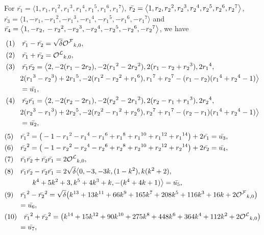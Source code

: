 \begin{lemma}\label{2.4l}
For $\bar{r_1}=\big\langle 1, r_1, {r_1}^2, {r_1}^3, {r_1}^4, {r_1}^5, {r_1}^6, {r_1}^7\big\rangle$, $\bar{r_2}=\big\langle 1, r_2, {r_2}^2, {r_2}^3, {r_2}^4,\\ {r_2}^5, {r_2}^6, {r_2}^7\big\rangle$, $\bar{r_3}=\big\langle 1, -r_1, -{r_1}^2, -{r_1}^3, -{r_1}^4, -{r_1}^5, -{r_1}^6, -{r_1}^7\big\rangle$ and $\bar{r_4}=\big\langle 1, -r_2,\\ -{r_2}^2, -{r_2}^3, -{r_2}^4, -{r_2}^5, -{r_2}^6, -{r_2}^7\big\rangle$, we have
\begin{align*}
&(1)\quad\bar{r_1}-\bar{r_2}=\sqrt{\delta}{{\mathcal{O^F}}}_{k,0},\\ 
&(2)\quad\bar{r_1}+\bar{r_2}={{\mathcal{O^L}}}_{k,0},\\
&(3)\quad\bar{r_1}\bar{r_2}=\big\langle 2, -2(r_1-2r_2), -2({r_1}^2-2{r_2}^2), 2(r_1-r_2+{r_2}^3), 2{r_1}^4, \\&\qquad 2({r_1}^3-{r_2}^3)+2{r_1}^5, -2({r_1}^2-{r_2}^2+{r_1}^6), {r_1}^7+{r_2}^7-(r_1-r_2)({r_1}^4+{r_2}^4-1)\big\rangle\\&\qquad=\bar{u_1},\\
&(4)\quad\bar{r_2}\bar{r_1}=\big{\langle} 2, -2(r_2-2r_1), -2({r_2}^2-2{r_1}^2), 2(r_2-r_1+{r_1}^3), 2{r_2}^4, \\&\qquad 2({r_2}^3-{r_1}^3)+2{r_2}^5, -2({r_2}^2-{r_1}^2+{r_2}^6), {r_2}^7+{r_1}^7-(r_2-r_1)({r_1}^4+{r_2}^4-1)\big{\rangle}\\&\qquad=\bar{u_2},\\
\end{align*}
\begin{align*}
&(5)\quad{\bar{r_1}}^2=\big(-1-{r_1}^2-{r_1}^4-{r_1}^6+{r_1}^8+{r_1}^{10}+{r_1}^{12}+{r_1}^{14}\big)+2\bar{r_1}=\bar{u_3},\\
&(6)\quad{\bar{r_2}}^2=\big(-1-{r_2}^2-{r_2}^4-{r_2}^6+{r_2}^8+{r_2}^{10}+{r_2}^{12}+{r_2}^{14}\big)+2\bar{r_2}=\bar{u_4},\\
&(7)\quad\bar{r_1}\bar{r_2}+\bar{r_2}\bar{r_1}=2\hq_{k,0},\\
&(8)\quad\bar{r_1}\bar{r_2}-\bar{r_2}\bar{r_1}=2\sqrt{\delta}\big\langle0, -3, -3k, (1-k^2), k(k^2+2),\\&\qquad \qquad  k^4+5k^2+3, k^5+4k^3+k, -(k^4+4k+1)\big\rangle=\bar{u_5},\\
&(9)\quad{\bar{r_1}}^2-{\bar{r_2}}^2=\sqrt{\delta}\big( k^{13}+13k^{11}+66k^9+165k^7+208k^5+116k^3+16k+2\hp_{k,0}\big)\\&\qquad=\bar{u_6},\\
&(10)\quad{\bar{r_1}}^2+{\bar{r_2}}^2=\big( k^{14}+15k^{12}+90k^{10}+275k^8+448k^6+364k^4+112k^2+2\hq_{k,0}\big)\\&\qquad=\bar{u_7},\\

\end{align*}
\end{lemma}
